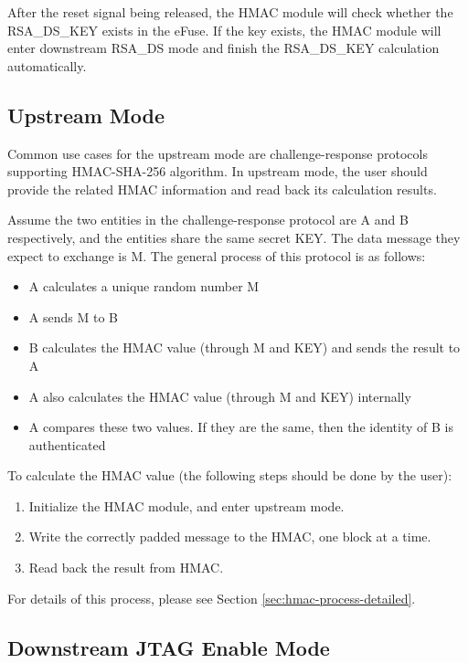 \documentclass[main\_\_EN.tex]{subfiles}
\begin{document}
After the reset signal being released, the HMAC module will check whether the RSA\_DS\_KEY exists in the eFuse. If the key exists, the HMAC module will enter downstream RSA\_DS mode and finish the RSA\_DS\_KEY calculation automatically.

\subsection{Upstream Mode}

Common use cases for the upstream mode are challenge-response protocols supporting HMAC-SHA-256 algorithm. In upstream mode, the user should provide the related HMAC information and read back its calculation results.

Assume the two entities in the challenge-response protocol are A and B respectively, and the entities share the same secret KEY. The data message they expect to exchange is M. The general process of this protocol is as follows:

\begin{itemize}
    \item A calculates a unique random number M
    \item A sends M to B
    \item B calculates the HMAC value (through M and KEY) and sends the result to A
    \item A also calculates the HMAC value (through M and KEY) internally
    \item A compares these two values. If they are the same, then the identity of B is authenticated
\end{itemize}

To calculate the HMAC value (the following steps should be done by the user):

\begin{enumerate}
    \item Initialize the HMAC module, and enter upstream mode.
    \item Write the correctly padded message to the HMAC, one block at a time.
    \item Read back the result from HMAC.
\end{enumerate}

For details of this process, please see Section \ref{sec:hmac-process-detailed}.

\subsection{Downstream JTAG Enable Mode}
\end{document}
